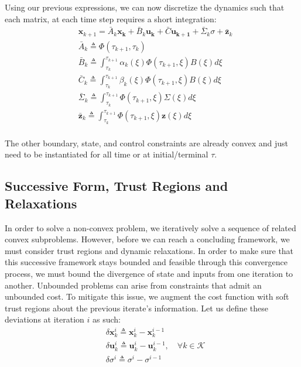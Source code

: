 Using our previous expressions, we can now discretize the dynamics such that each matrix, at each time step requires a short integration:
 \begin{align}
& \mathbf{x}_{k+1} = \bar{A}_k\mathbf{x_k} + \bar{B}_k\mathbf{u_k} + \bar{C}\mathbf{u_{k+1}} + \bar{\Sigma}_k\sigma + \bar{\mathbf{z}}_k  \\
& \bar{A}_k \triangleq  \Phi(\tau_{k+1},\tau_k)\\
& \bar{B}_k \triangleq \int_{\tau_k}^{\tau_{k+1}} \alpha_k(\xi) \Phi(\tau_{k+1},\xi) B(\xi) d\xi\\
& \bar{C}_k \triangleq \int_{\tau_k}^{\tau_{k+1}} \beta_k(\xi) \Phi(\tau_{k+1},\xi) B(\xi)  d\xi\\
& \bar{\Sigma}_k \triangleq \int_{\tau_k}^{\tau_{k+1}} \Phi(\tau_{k+1},\xi) \Sigma(\xi) d\xi\\
& \bar{\mathbf{z}}_k \triangleq \int_{\tau_k}^{\tau_{k+1}} \Phi(\tau_{k+1},\xi) \mathbf{z}(\xi) d\xi\\
\end{align}

The other boundary, state, and control constraints are already convex and just need to be instantiated for all time or at initial/terminal $\tau$.


\subsection{Successive Form, Trust Regions and Relaxations}
In order to solve a non-convex problem, we iteratively solve a sequence of related convex subproblems. However, before we can reach a concluding framework, we must consider trust regions and dynamic relaxations. In order to make sure that this successive framework stays bounded and feasible through this convergence process, we must bound the divergence of state and inputs from one iteration to another. Unbounded problems can arise from constraints that admit an unbounded cost. To mitigate this issue, we augment the cost function with soft trust regions about the previous iterate's information. Let us define these deviations at iteration $i$ as such:
\begin{align}
& \delta \mathbf{x}_k^i \triangleq \mathbf{x}_k^i - \mathbf{x}_k^{i-1} \\
& \delta \mathbf{u}_k^i \triangleq \mathbf{u}_k^i - \mathbf{u}_k^{i-1}, \quad \forall k \in \mathcal{K}\\
& \delta \sigma^i \triangleq \sigma^i - \sigma^{i-1}
\end{align}

